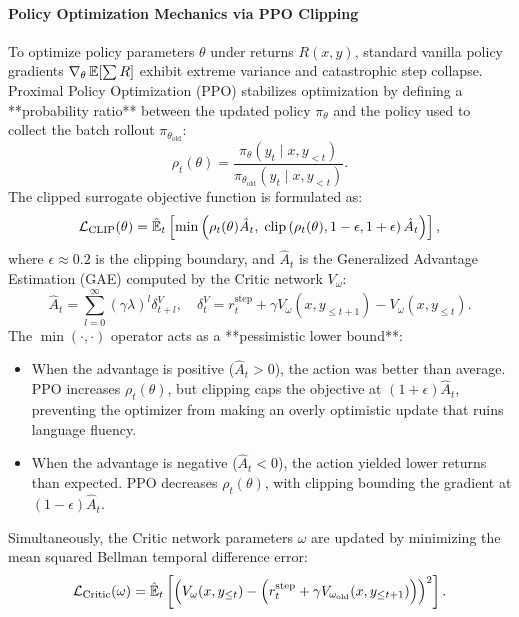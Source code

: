\documentclass[../../../main.tex]{subfiles}
\begin{document}
\paragraph{Policy Optimization Mechanics via PPO Clipping}
To optimize policy parameters $\theta$ under returns $R(x, y)$, standard vanilla policy gradients $\nabla_\theta \operatorname*{\mathbb{E}}[\sum R]$ exhibit extreme variance and catastrophic step collapse. Proximal Policy Optimization (PPO) \citep{schulman2017ppo} stabilizes optimization by defining a **probability ratio** between the updated policy $\pi_\theta$ and the policy used to collect the batch rollout $\pi_{\theta_{\text{old}}}$:
\begin{equation}
\label{eq:ppo_probability_ratio}
\rho_t(\theta) = \frac{\pi_\theta(y_t \mid x, y_{<t})}{\pi_{\theta_{\text{old}}}(y_t \mid x, y_{<t})}.
\end{equation}
The clipped surrogate objective function is formulated as:
\begin{equation}
\label{eq:ppo_clipping_formula}
\mathcal{L}_{\text{CLIP}}(\theta) = \hat{\operatorname*{\mathbb{E}}}_t \left[ \min\left( \rho_t(\theta)\hat{A}_t, \; \operatorname{clip}\left(\rho_t(\theta), 1-\epsilon, 1+\epsilon\right)\hat{A}_t \right) \right],
\end{equation}
where $\epsilon \approx 0.2$ is the clipping boundary, and $\hat{A}_t$ is the Generalized Advantage Estimation (GAE) computed by the Critic network $V_\omega$:
\begin{equation}
\hat{A}_t = \sum_{l=0}^{\infty} (\gamma \lambda)^l \delta_{t+l}^V, \quad \delta_t^V = r_t^{\text{step}} + \gamma V_\omega(x, y_{\le t+1}) - V_\omega(x, y_{\le t}).
\end{equation}
The $\min(\cdot, \cdot)$ operator acts as a **pessimistic lower bound**:
\begin{itemize}
    \item When the advantage is positive ($\hat{A}_t > 0$), the action was better than average. PPO increases $\rho_t(\theta)$, but clipping caps the objective at $(1+\epsilon)\hat{A}_t$, preventing the optimizer from making an overly optimistic update that ruins language fluency.
    \item When the advantage is negative ($\hat{A}_t < 0$), the action yielded lower returns than expected. PPO decreases $\rho_t(\theta)$, with clipping bounding the gradient at $(1-\epsilon)\hat{A}_t$.
\end{itemize}

Simultaneously, the Critic network parameters $\omega$ are updated by minimizing the mean squared Bellman temporal difference error:
\begin{equation}
\label{eq:critic_mse_loss}
\mathcal{L}_{\text{Critic}}(\omega) = \hat{\operatorname*{\mathbb{E}}}_t \left[ \left( V_\omega(x, y_{\le t}) - \left(r_t^{\text{step}} + \gamma V_{\omega_{\text{old}}}(x, y_{\le t+1})\right) \right)^2 \right].
\end{equation}
\end{document}
